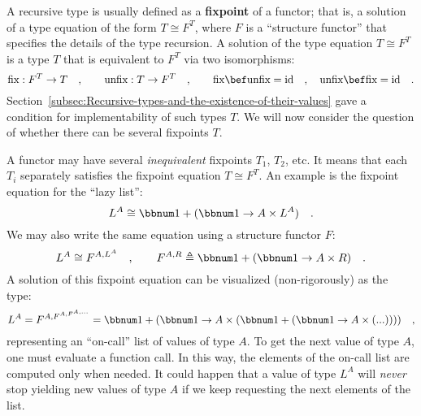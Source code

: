 A recursive type is usually defined as a \textbf{fixpoint} of
a functor; that is, a solution of a type equation
of the form $T\cong F^{T}$, where $F$ is a \textsf{``}structure functor\textsf{''}
that specifies the details of the type recursion. A solution of the
type equation $T\cong F^{T}$ is a type $T$ that is equivalent to
$F^{T}$ via two isomorphisms:
\[
\text{fix}:F^{T}\rightarrow T\quad,\quad\quad\text{unfix}:T\rightarrow F^{T}\quad,\quad\quad\text{fix}\bef\text{unfix}=\text{id}\quad,\quad\text{unfix}\bef\text{fix}=\text{id}\quad.
\]
Section~\ref{subsec:Recursive-types-and-the-existence-of-their-values}
gave a condition for implementability of such types $T$. We will
now consider the question of whether there can be several fixpoints
$T$.

A functor may have several \emph{inequivalent} fixpoints $T_{1}$,
$T_{2}$, etc. It means that each $T_{i}$ separately satisfies the
fixpoint equation $T\cong F^{T}$. An example is the fixpoint equation
for the \textsf{``}lazy list\textsf{''}:
\begin{equation}
L^{A}\cong\bbnum 1+(\bbnum 1\rightarrow A\times L^{A})\quad.\label{eq:fixpoint-type-equation-for-oncall-list}
\end{equation}
We may also write the same equation using a structure functor $F$:
\[
L^{A}\cong F^{A,L^{A}}\quad,\quad\quad F^{A,R}\triangleq\bbnum 1+(\bbnum 1\rightarrow A\times R)\quad.
\]
A solution of this fixpoint equation can be visualized (non-rigorously)
as the type:
\[
L^{A}=F^{A,F^{A,F^{A,...}}}=\bbnum 1+(\bbnum 1\rightarrow A\times(\bbnum 1+(\bbnum 1\rightarrow A\times(...))))\quad,
\]
representing an \textsf{``}on-call\textsf{''} list of values of type $A$. To get
the next value of type $A$, one must evaluate a function call. In
this way, the elements of the on-call list are computed only when
needed. It could happen that a value of type $L^{A}$ will \emph{never}
stop yielding new values of type $A$ if we keep requesting the next
elements of the list.

